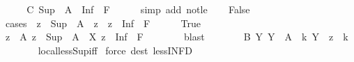 \begin{isabellebody}
\ \ \isamarkupfalse%
\ \isamarkupfalse%
\ C{\isacharcolon}{\kern0pt}\ {\isachardoublequoteopen}{\isasymSqinter}{\isacharparenleft}{\kern0pt}Sup\ {\isacharbackquote}{\kern0pt}\ A{\isacharparenright}{\kern0pt}\ {\isachargreater}{\kern0pt}\ {\isasymSqunion}{\isacharparenleft}{\kern0pt}Inf\ {\isacharbackquote}{\kern0pt}\ {\isacharquery}{\kern0pt}F{\isacharparenright}{\kern0pt}{\isachardoublequoteclose}\isanewline
\ \ \ \ \isamarkupfalse%
\ {\isacharparenleft}{\kern0pt}simp\ add{\isacharcolon}{\kern0pt}\ not{\isacharunderscore}{\kern0pt}le{\isacharparenright}{\kern0pt}\isanewline
\ \ \isamarkupfalse%
\ False\isanewline
\ \ \isamarkupfalse%
\ {\isacharparenleft}{\kern0pt}cases\ {\isachardoublequoteopen}{\isasymexists}\ z\ {\isachardot}{\kern0pt}\ {\isasymSqinter}{\isacharparenleft}{\kern0pt}Sup\ {\isacharbackquote}{\kern0pt}\ A{\isacharparenright}{\kern0pt}\ {\isachargreater}{\kern0pt}\ z\ {\isasymand}\ z\ {\isachargreater}{\kern0pt}\ {\isasymSqunion}{\isacharparenleft}{\kern0pt}Inf\ {\isacharbackquote}{\kern0pt}\ {\isacharquery}{\kern0pt}F{\isacharparenright}{\kern0pt}{\isachardoublequoteclose}{\isacharparenright}{\kern0pt}\isanewline
\ \ \ \ \isamarkupfalse%
\ True\isanewline
\ \ \ \ \isamarkupfalse%
\ \isamarkupfalse%
\ z\ \ A{\isacharcolon}{\kern0pt}\ {\isachardoublequoteopen}z\ {\isacharless}{\kern0pt}\ {\isasymSqinter}{\isacharparenleft}{\kern0pt}Sup\ {\isacharbackquote}{\kern0pt}\ A{\isacharparenright}{\kern0pt}{\isachardoublequoteclose}\ \ X{\isacharcolon}{\kern0pt}\ {\isachardoublequoteopen}z\ {\isachargreater}{\kern0pt}\ {\isasymSqunion}{\isacharparenleft}{\kern0pt}Inf\ {\isacharbackquote}{\kern0pt}\ {\isacharquery}{\kern0pt}F{\isacharparenright}{\kern0pt}{\isachardoublequoteclose}\isanewline
\ \ \ \ \ \ \isamarkupfalse%
\ blast\isanewline
\ \ \ \ \isamarkupfalse%
\ \isamarkupfalse%
\ B{\isacharcolon}{\kern0pt}\ {\isachardoublequoteopen}{\isasymAnd}Y{\isachardot}{\kern0pt}\ Y\ {\isasymin}\ A\ {\isasymLongrightarrow}\ {\isasymexists}k\ {\isasymin}Y\ {\isachardot}{\kern0pt}\ z\ {\isacharless}{\kern0pt}\ k{\isachardoublequoteclose}\isanewline
\ \ \ \ \ \ \isamarkupfalse%
\ local{\isachardot}{\kern0pt}less{\isacharunderscore}{\kern0pt}Sup{\isacharunderscore}{\kern0pt}iff\ \isamarkupfalse%
{\isacharparenleft}{\kern0pt}force\ dest{\isacharcolon}{\kern0pt}\ less{\isacharunderscore}{\kern0pt}INF{\isacharunderscore}{\kern0pt}D{\isacharparenright}{\kern0pt}\isanewline

\end{isabellebody}
